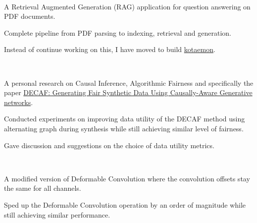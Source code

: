\\
\begin{zitemize}
    \item A Retrieval Augmented Generation (RAG) application for question answering on PDF
    documents.
    \item Complete pipeline from PDF parsing to indexing, retrieval and generation.
    \item Instead of continue working on this, I have moved to build \href{https://github.com/Cinnamon/kotaemon}{kotaemon}.
\end{zitemize}


\\
\begin{zitemize}
    \item A personal research on Causal Inference, Algorithmic Fairness and specifically the paper \href{https://arxiv.org/abs/2110.12884}{DECAF: Generating Fair Synthetic Data Using Causally-Aware Generative networks}.
    \item Conducted experiments on improving data utility of the DECAF method using alternating graph during synthesis while still achieving similar level of  fairness.
    \item Gave discussion and suggestions on the choice of data utility metrics.
\end{zitemize}

\\
\begin{zitemize}
    \item A modified version of Deformable Convolution where the convolution offsets
    stay the same for all channels.
    \item Sped up the Deformable Convolution operation by an order of magnitude while still achieving similar performance.
\end{zitemize}

